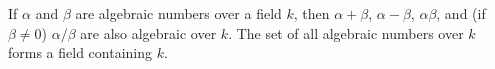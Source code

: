 If $\alpha$ and $\beta$ are algebraic numbers over a field $k$, then $\alpha + \beta$, $\alpha - \beta$, $\alpha\beta$, and (if $\beta \neq 0$) $\alpha/\beta$ are also algebraic over $k$. The set of all algebraic numbers over $k$ forms a field containing $k$.
